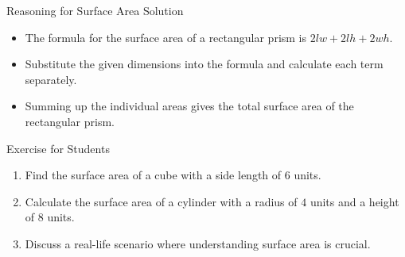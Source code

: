 \begin{frame}{Reasoning for Surface Area Solution}
  \begin{itemize}
    \item The formula for the surface area of a rectangular prism is $2lw + 2lh + 2wh$.
    \item Substitute the given dimensions into the formula and calculate each term separately.
    \item Summing up the individual areas gives the total surface area of the rectangular prism.
  \end{itemize}
\end{frame}

\begin{frame}{Exercise for Students}
  \begin{enumerate}
    \item Find the surface area of a cube with a side length of $6$ units.
    \item Calculate the surface area of a cylinder with a radius of $4$ units and a height of $8$ units.
    \item Discuss a real-life scenario where understanding surface area is crucial.
  \end{enumerate}
\end{frame}

